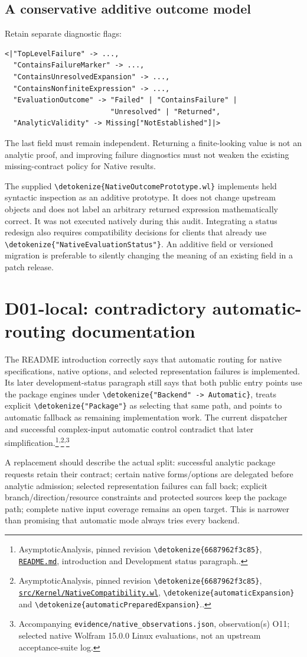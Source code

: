 \documentclass[11pt]{article}
\newcommand{\code}[1]{{\ttfamily\expandafter\nolinkurl\expandafter{\detokenize{#1}}}}
\newcommand{\repo}{https://github.com/VladimirReshetnikov/Asymptotic/blob/6687962f3c858a4f93623cfc496f33e35c6763d4/}
\newcommand{\src}[2]{\footnote{AsymptoticAnalysis, pinned revision \code{6687962f3c85}, \href{\repo#1}{\nolinkurl{#1}}, #2.}}
\newcommand{\obs}[1]{\footnote{Accompanying \nolinkurl{evidence/native_observations.json}, observation(s) #1; selected native Wolfram 15.0.0 Linux evaluations, not an upstream acceptance-suite log.}}
\begin{document}
\subsection{A conservative additive outcome model}
Retain separate diagnostic flags:
\begin{lstlisting}
<|"TopLevelFailure" -> ...,
  "ContainsFailureMarker" -> ...,
  "ContainsUnresolvedExpansion" -> ...,
  "ContainsNonfiniteExpression" -> ...,
  "EvaluationOutcome" -> "Failed" | "ContainsFailure" |
                         "Unresolved" | "Returned",
  "AnalyticValidity" -> Missing["NotEstablished"]|>
\end{lstlisting}
The last field must remain independent. Returning a finite-looking value is not an analytic proof, and improving failure diagnostics must not weaken the existing missing-contract policy for Native results.

The supplied \code{NativeOutcomePrototype.wl} implements held syntactic inspection as an additive prototype. It does not change upstream objects and does not label an arbitrary returned expression mathematically correct. It was not executed natively during this audit. Integrating a status redesign also requires compatibility decisions for clients that already use \code{"NativeEvaluationStatus"}. An additive field or versioned migration is preferable to silently changing the meaning of an existing field in a patch release.

\section{D01-local: contradictory automatic-routing documentation}

The README introduction correctly says that automatic routing for native specifications, native options, and selected representation failures is implemented. Its later development-status paragraph still says that both public entry points use the package engines under \code{"Backend" -> Automatic}, treats explicit \code{"Package"} as selecting that same path, and points to automatic fallback as remaining implementation work. The current dispatcher and successful complex-input automatic control contradict that later simplification.\src{README.md}{introduction and Development status paragraph.}\textsuperscript{,}\src{src/Kernel/NativeCompatibility.wl}{\code{automaticExpansion} and \code{automaticPreparedExpansion}.}\textsuperscript{,}\obs{O11}

A replacement should describe the actual split: successful analytic package requests retain their contract; certain native forms/options are delegated before analytic admission; selected representation failures can fall back; explicit branch/direction/resource constraints and protected sources keep the package path; complete native input coverage remains an open target. This is narrower than promising that automatic mode always tries every backend.
\end{document}
